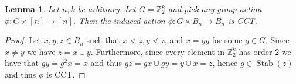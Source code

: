 \documentclass[10 pt]{amsart}
\theoremstyle{plain}
\newtheorem{lem}[thm]{Lemma}
\newtheorem{cor}[thm]{Corollary}
\theoremstyle{definition}
\theoremstyle{remark}
\numberwithin{equation}{section}
\def\Stab{\operatorname{Stab}}
\begin{document}
\iffalse

\begin{lem}
\label{lem:order_2_CCT}
Let $n,k$ be arbitrary. Let $G = \mathbb Z_2^k$ and pick any group action $\phi:G\times [n] \rightarrow [n].$ Then the induced action $\phi:G \times B_n \rightarrow B_n$ is CCT.
\end{lem}

\begin{proof}
Let $x,y,z\in B_n$ such that $x \lessdot z, y \lessdot z$, and  $x = gy$ for some $g\in G$.  Since $x\ne y$ we have $z=x\cup y$.  Furthermore, since every element in $\mathbb Z_2^k$ has order 2 we have that $gy = g^2x = x$ and thus $gz = gx\cup gy = y\cup x = z$, hence $g\in\Stab(z)$ and thus $\phi$ is CCT.
\end{proof}
%


\end{document}
